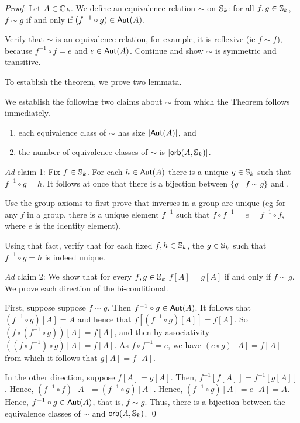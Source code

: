 \emph{Proof}:
Let $A\in\mbox{$\mathbb{G}_{k}$}$. We define an equivalence relation $\sim$ on $\mbox{$\mathbb{S}_{k}$}$: for all $f,g\in\mbox{$\mathbb{S}_{k}$}$, $f\sim g$ if and only if $(f^{-1}\circ g)\in\mbox{$\mathsf{Aut}(A)$}$. 

\begin{aside}
    Verify that $\sim$ is an equivalence relation, for example, it is reflexive (ie $f\sim f$), because $f^{-1}\circ f = e$ and $e\in \mbox{$\mathsf{Aut}(A)$}$. Continue and show $\sim$ is symmetric and transitive.
\end{aside}

To establish the theorem, we prove two lemmata. 

We establish the following two claims about $\sim$ from which the Theorem follows immediately.
\begin{enumerate}
\item
each equivalence class of $\sim$ has size $\mbox{$|\mbox{$\mathsf{Aut}(A)$}|$}$, and
\item
the number of equivalence classes of $\sim$ is $\mbox{$|\mbox{$\mathsf{orb}(A,\mbox{$\mathbb{S}_{k}$})$}|$}$.
\end{enumerate}
\emph{Ad} claim 1: Fix $f\in\mbox{$\mathbb{S}_{k}$}$. For each $h\in\mbox{$\mathsf{Aut}(A)$}$ there is a unique $g\in\mbox{$\mathbb{S}_{k}$}$ such that $f^{-1}\circ g = h$. It follows at once that there is a bijection between $\{g\mid f\sim g\}$ and .

\begin{aside}
    Use the group axioms to first prove that inverses in a group are unique (eg for any $f$ in a group, there is a unique element $f^{-1}$ such that $f \circ f^{-1} = e = f^{-1} \circ f$, where $e$ is the identity element).

    Using that fact, verify that for each fixed $f, h \in \mbox{$\mathbb{S}_{k}$}$, the $g \in \mbox{$\mathbb{S}_{k}$}$ such that $f^{-1}\circ g = h$ is indeed unique. 
\end{aside}

\emph{Ad} claim 2: We show that for every $f,g\in\mbox{$\mathbb{S}_{k}$}$ $f[A]=g[A]$ if and only if $f\sim g$. We prove each direction of the bi-conditional. 

First, suppose suppose $f\sim g$. Then 
$f^{-1}\circ g \in \mbox{$\mathsf{Aut}(A)$}$. It follows that $(f^{-1}\circ g)[A] = A$ and hence that $f[(f^{-1}\circ g)[A]] = f[A]$. So $(f\circ(f^{-1}\circ g))[A] = f[A]$, and then by associativity $((f\circ f^{-1})\circ g)[A] = f[A]$. As $f \circ f^{-1} = e$, we have $(e\circ g)[A] = f[A]$ from which it follows that $g[A]=f[A]$. 

In the other direction, suppose $f[A]=g[A]$. Then, $f^{-1}[f[A]]=f^{-1}[g[A]]$. Hence, $(f^{-1}\circ f)[A]=(f^{-1}\circ g)[A]$. Hence, $(f^{-1}\circ g)[A]=e[A]= A$. Hence, $f^{-1}\circ g\in \mbox{$\mathsf{Aut}(A)$}$, that is, $f\sim g$. Thus, there is a bijection between the equivalence classes of $\sim$ and $\mbox{$\mathsf{orb}(A,\mbox{$\mathbb{S}_{k}$})$}$. \qed

